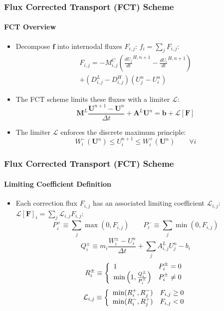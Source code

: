 \documentclass{beamer}
\renewcommand{\ij}{_{i,j}}
\newcommand{\U}{\mathbf{U}}
\newcommand{\M}{\mathbf{M}}
\newcommand{\A}{\mathbf{A}}
\newcommand{\F}{\mathbf{F}}
\renewcommand{\L}{\mathcal{L}}
\newcommand{\f}{\mathbf{f}}
\renewcommand{\b}{\mathbf{b}}
\newcommand{\dt}{\Delta t}
\begin{document}
\begin{frame}
\frametitle{Flux Corrected Transport (FCT) Scheme}
\framesubtitle{FCT Overview}

\begin{itemize}
   \item Decompose $\f$ into internodal fluxes $F\ij$: $f_i = \sum\limits_j F\ij$:
   \begin{multline}
      F\ij = -M\ij^C\left(\frac{dU_j}{dt}^{H,n+1} - \frac{dU_i}{dt}^{H,n+1}\right)\\
      + (D\ij^L-D\ij^H)(U^n_j - U^n_i)
   \end{multline}
   \item The FCT scheme limits these fluxes with a limiter $\L$:
   \begin{equation}
      \M^L\frac{\U^{n+1}-\U^n}{\dt} + \A^L\U^n = \b + \L[\F]
   \end{equation}
   \item The limiter $\L$ enforces the discrete maximum principle:
   \begin{equation}\label{eq:dmp}
         W_i^-(\U^n)\leq
         U_i^{n+1}\leq
         W_i^+(\U^n)\qquad\forall i
   \end{equation}
\end{itemize}

\end{frame}
\begin{frame}
\frametitle{Flux Corrected Transport (FCT) Scheme}
\framesubtitle{Limiting Coefficient Definition}

\begin{itemize}
   \item Each correction flux $F\ij$ has an associated limiting
   coefficient $\L\ij$: $\L[\F]_i = \sum\limits_j \L\ij F\ij$:
\begin{equation}\label{eq:P_defs}
   P_i^+ \equiv \sum\limits_j\max(0,F_{i,j}) \qquad
   P_i^- \equiv \sum\limits_j\min(0,F_{i,j})
\end{equation}
\begin{equation}\label{eq:Q_defs}
      Q_i^\pm \equiv m_i\frac{W_i^\pm-U_i^n}{\Delta t}
      + \sum\limits_j A_{i,j}^L U_j^n - b_i
\end{equation}
\begin{equation}\label{eq:R_defs}
   R_i^\pm \equiv\left\{
      \begin{array}{l l}
         1                                          & P_i^\pm = 0\\
         \min\left(1,\frac{Q_i^\pm}{P_i^\pm}\right) & P_i^\pm \ne 0
      \end{array}
      \right.
\end{equation}
\begin{equation}
   \L\ij \equiv\left\{
      \begin{array}{l l}
         \min(R_i^+,R_j^-) & F_{i,j} \geq 0\\
         \min(R_i^-,R_j^+) & F_{i,j} < 0
      \end{array}
      \right.
\end{equation}
\end{itemize}

\end{frame}
\end{document}
